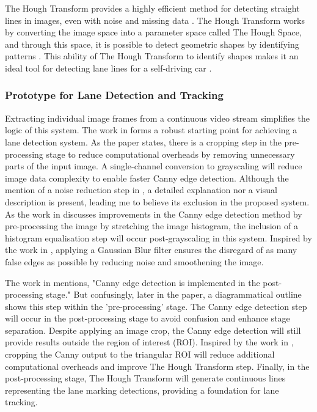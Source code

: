 \documentclass[9pt,conference]{IEEEtran}
\begin{document}
The Hough Transform provides a highly efficient method for detecting straight lines in images, even with noise and missing data \cite{b4}. The Hough Transform works by converting the image space into a parameter space called The Hough Space, and through this space, it is possible to detect geometric shapes by identifying patterns \cite{b5}. This ability of The Hough Transform to identify shapes makes it an ideal tool for detecting lane lines for a self-driving car \cite{b6}.

\subsubsection{Prototype for Lane Detection and Tracking}

Extracting individual image frames from a continuous video stream simplifies the logic of this system. The work in \cite{b3} forms a robust starting point for achieving a lane detection system. As the paper states, there is a cropping step in the pre-processing stage to reduce computational overheads by removing unnecessary parts of the input image. A single-channel conversion to grayscaling will reduce image data complexity to enable faster Canny edge detection. Although the mention of a noise reduction step in \cite{b3}, a detailed explanation nor a visual description is present, leading me to believe its exclusion in the proposed system. As the work in \cite{b7} discusses improvements in the Canny edge detection method by pre-processing the image by stretching the image histogram, the inclusion of a histogram equalisation step will occur post-grayscaling in this system. Inspired by the work in \cite{b6}, applying a Gaussian Blur filter ensures the disregard of as many false edges as possible by reducing noise and smoothening the image.

The work in \cite{b3} mentions, "Canny edge detection is implemented in the post-processing stage." But confusingly, later in the paper, a diagrammatical outline shows this step within the 'pre-processing' stage. The Canny edge detection step will occur in the post-processing stage to avoid confusion and enhance stage separation. Despite applying an image crop, the Canny edge detection will still provide results outside the region of interest (ROI). Inspired by the work in \cite{b6}, cropping the Canny output to the triangular ROI will reduce additional computational overheads and improve The Hough Transform step. Finally, in the post-processing stage, The Hough Transform will generate continuous lines representing the lane marking detections, providing a foundation for lane tracking.
\end{document}
